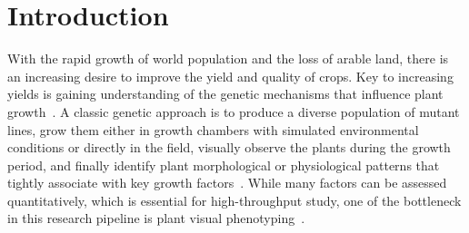 \section{Introduction}
\label{sec:intro}

With the rapid growth of world population and the loss of arable land, there is an increasing desire to improve the yield and quality of crops.  Key to increasing yields is gaining understanding of the genetic mechanisms that influence plant growth~\cite{doos2002population}.
%
A classic genetic approach is to produce a diverse population of mutant lines, grow them either in growth chambers with simulated environmental conditions or directly in the field, visually observe the plants during the growth period, and finally identify plant morphological or physiological patterns that tightly associate with key growth factors~\cite{houle2010phenomics}.
%
While many factors can be assessed quantitatively, which is essential for high-throughput study, one of the bottleneck in this research pipeline is plant visual phenotyping~\cite{walter2015plant}.

